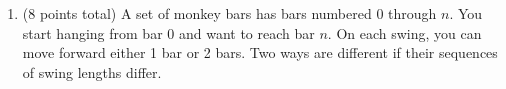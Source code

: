 \documentclass[11pt]{article}
\newcommand{\sectiontitle}[1]{\begin{center}\LARGE\textbf{#1}\end{center}}
\begin{document}
\begin{enumerate}
$T(1) =$ \underline{\hspace{2cm}}\\

$\begin{array}{lccc}
T(n) = & \underline{\hspace{5cm}} & + & \underline{\hspace{5cm}} \\[2pt]
& \text{work done by recursive calls} & &  \text{nonrecursive work}
\end{array}$

\newpage
\sectiontitle{Section 4 (1D Dynamic Programming)}
\item (8 points total) A set of monkey bars has bars numbered $0$ through $n$. You start hanging from bar 0 and want to reach bar $n$. On each swing, you can move forward either 1 bar or 2 bars. Two ways are different if their sequences of swing lengths differ.


\end{enumerate}
\end{document}
